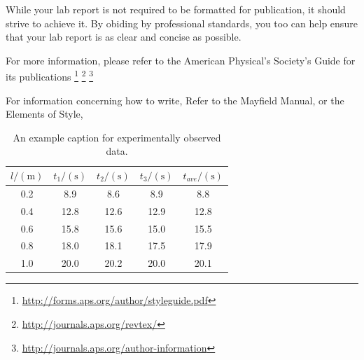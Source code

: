 \documentclass[
    10pt,aps,prl,
    amsfonts,
    amssymb,
    amsmath,
    runinaddress,
    secnum,
    showkeys,
    superscriptaddress,
    twocolumn,
]{revtex4}
\begin{document}
    While your lab report is not required to be formatted for
        publication, it should strive to achieve it.
    By obiding by professional standards, you too can help ensure
        that your lab report is as clear and concise as possible.
   
    For more information, please refer to the American Physical's
        Society's Guide for its publications
    \footnote{\url{http://forms.aps.org/author/styleguide.pdf}}
    \footnote{\url{http://journals.aps.org/revtex/}}
    \footnote{\url{http://journals.aps.org/author-information}}
    \cite{Simon:2010:SIGCSE}
    \cite{PeerInstruction}

    For information concerning how to write,
        Refer to the Mayfield Manual\cite{Mayfield},
        or the Elements of Style\cite{StrunkWilliam},

    \begin{table}[h]
        \begin{ruledtabular}
        \begin{tabular}{c|ccc|c}
            $l/(\si{\meter})$ &
            $t_1/(\si{\second})$ &
            $t_2/(\si{\second})$ &
            $t_3/(\si{\second})$ &
            $t_{ave}/(\si{\second})$ \\
            \hline
            0.2 &  8.9 &  8.6 &  8.9 &  8.8 \\
            0.4 & 12.8 & 12.6 & 12.9 & 12.8 \\
            0.6 & 15.8 & 15.6 & 15.0 & 15.5 \\
            0.8 & 18.0 & 18.1 & 17.5 & 17.9 \\
            1.0 & 20.0 & 20.2 & 20.0 & 20.1 \\
        \end{tabular}
        \end{ruledtabular}
        \caption{An example caption for experimentally observed data.}
        \label{tab:data}
    \end{table}
\end{document}
